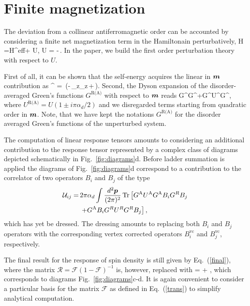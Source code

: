 \section{Finite magnetization}\label{sec:appd}
The deviation from a collinear antiferromagnetic order can be accounted by considering a finite net magnetization term in the Hamiltonain perturbatively,
\be
H =H^\textrm{eff}+ U, \qquad U = -\Delta\,\cdot\bb{\sigma}.
\e
In the paper, we build the first order perturbation theory with respect to $U$. 

First of all, it can be shown that the self-energy acquires the linear in $\boldsymbol{m}$ contribution as
\be\label{eq:SEcorr}
\im \Sigma^ = \mp{}\,(\ep-\Delta\,\Lambda_z\Sigma_z\,\cdot\bb{\sigma}+\Delta\,\cdot\bb{\sigma}).
\e
Second, the Dyson expansion of the disorder-averaged Green's functions $G^\text{R(A)}$ with respect to $\boldsymbol{m}$ reads
\be
G^\rightarrow G^+G^U^G^,
\e
where $U^\text{R(A)}=U(1 \pm i \pi\alpha_d/2)$ and we disregarded terms starting from quadratic order in $\boldsymbol{m}$. Note, that 
we have kept the notations $G^\text{R(A)}$ for the disorder averaged Green's functions of the unperturbed system. 

The computation of linear response tensors amounts to considering an additional contribution to the response tensor represented by a complex class of diagrams depicted schematically in  Fig.~\ref{fig:diagrams}d. Before ladder summation is applied the diagrams of Fig.~\ref{fig:diagrams}d correspond to a contribution to the correlator of two operators $B_i$ and $B_j$ of the type 
\begin{align}
\mathcal{U}_{ij} =\,& 2\pi\alpha_d \int \frac{d^2\boldsymbol{p}}{(2\pi)^2} \operatorname{Tr}\left[G^\text{A} U^\text{A} G^\text{A} B_i G^R B_j\nonumber\right.\\
&\left.+G^\text{A} B_i G^R U^R G^R B_j\right],   
\end{align}
which has yet be dressed. The dressing amounts to replacing both $B_i$ and $B_j$ operators with the corresponding vertex corrected operators $B^\textrm{vc}_i$ and $B^\textrm{vc}_j$, respectively. 

The final result for the response of spin density is still given by Eq.~(\ref{final}), where the matrix $\mathcal{R}=\mathcal{F}(1-\mathcal{F})^{-1}$ is, however, replaced with 
\be
\label{eq:mresp}
= + ,
\e
which corresponds to diagrams Fig.~\ref{fig:diagrams}c-d.
It is again convenient to consider a particular basis for the matrix $\mathcal{F}$ as defined in Eq.~(\ref{trans}) to simplify analytical computation.  

